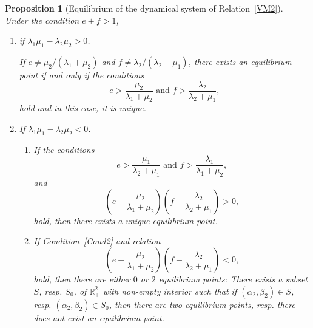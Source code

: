 \documentclass[english]{amsart}
\newcommand{\R}{\ensuremath{\mathbb{R}}}
\newtheorem{proposition}{Proposition}
\numberwithin{proposition}{section}
\begin{document}
\begin{proposition}[Equilibrium of the dynamical system of Relation~\eqref{VM2}]\label{M2ExFP}\ \\
Under the condition $e{+}f>1$,
\begin{enumerate}
\item if $\lambda_1\mu_1{-}\lambda_2\mu_2>0$.

\medskip
\noindent  If $e{\not=}\mu_2/(\lambda_1{+}\mu_2)$ and $f{\not=}\lambda_2/(\lambda_2{+}\mu_1)$,
there exists an equilibrium point if and only if the conditions
\begin{equation}\label{Cond21}
e > \frac{\mu_2}{\lambda_1{+}\mu_2} \text{ and }   f >\frac{\lambda_2}{\lambda_2{+}\mu_1},
\end{equation}
hold and in this case, it is unique. 
\item If $\lambda_1\mu_1{-}\lambda_2\mu_2<0$.\medskip
  \begin{enumerate}
  \item If the conditions
\begin{equation}\label{Cond2}
e > \frac{\mu_1}{\lambda_2{+}\mu_1} \text{ and }   f >\frac{\lambda_1}{\lambda_1{+}\mu_2},
\end{equation}
and 
\begin{equation}\label{Cond3}
\left(e{-}\frac{\mu_2}{\lambda_1{+}\mu_2}\right)\left(f {-}\frac{\lambda_2}{\lambda_2{+}\mu_1}\right) > 0,
\end{equation}
hold, then there exists a unique equilibrium point.
\item If Condition~\eqref{Cond2}
and relation
\begin{equation}\label{Cond32}
\left(e{-}\frac{\mu_2}{\lambda_1{+}\mu_2}\right)\left(f {-}\frac{\lambda_2}{\lambda_2{+}\mu_1}\right) < 0,
\end{equation}
hold, then there are  either $0$ or $2$ equilibrium points: There exists a subset $S$, resp. $S_0$, of $\R_+^2$ with non-empty interior such that if $(\alpha_2,\beta_2){\in}S$, resp. $(\alpha_2,\beta_2){\in}S_0$, then there are two equilibrium points, resp. there does not exist an equilibrium point. 
\end{enumerate}
\end{enumerate}
\end{proposition}
\end{document}
